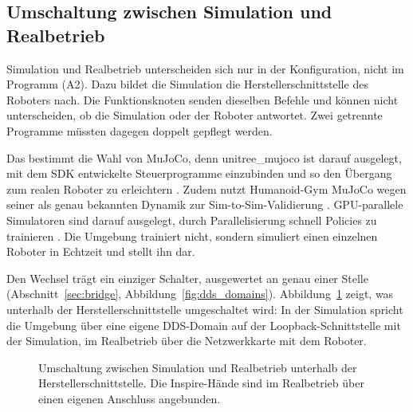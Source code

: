 \subsection{Umschaltung zwischen Simulation und Realbetrieb}
\label{sec:sim_real_schalter}
Simulation und Realbetrieb unterscheiden sich nur in der Konfiguration, nicht im Programm (A2).
Dazu bildet die Simulation die Herstellerschnittstelle des Roboters nach.
Die Funktionsknoten senden dieselben Befehle und können nicht unterscheiden, ob die Simulation oder der Roboter antwortet.
Zwei getrennte Programme müssten dagegen doppelt gepflegt werden.

Das bestimmt die Wahl von MuJoCo, denn unitree\_mujoco ist darauf ausgelegt, mit dem SDK entwickelte Steuerprogramme einzubinden und so den Übergang zum realen Roboter zu erleichtern \cite{UnitreeMujoco}.
Zudem nutzt Humanoid-Gym MuJoCo wegen seiner als genau bekannten Dynamik zur Sim-to-Sim-Validierung \cite{Gu2024}.
GPU-parallele Simulatoren sind darauf ausgelegt, durch Parallelisierung schnell Policies zu trainieren \cite{Rudin2021} \cite{Mittal2023}.
Die Umgebung trainiert nicht, sondern simuliert einen einzelnen Roboter in Echtzeit und stellt ihn dar.

Den Wechsel trägt ein einziger Schalter, ausgewertet an genau einer Stelle (Abschnitt~\ref{sec:bridge}, Abbildung~\ref{fig:dds_domains}).
Abbildung~\ref{fig:sim_real_schalter} zeigt, was unterhalb der Herstellerschnittstelle umgeschaltet wird: In der Simulation spricht die Umgebung über eine eigene DDS-Domain auf der Loopback-Schnittstelle mit der Simulation, im Realbetrieb über die Netzwerkkarte mit dem Roboter.

\begin{figure}[htbp]
  \centering
  
  \caption[Umschaltung zwischen Simulation und Realbetrieb]{Umschaltung zwischen Simulation und Realbetrieb unterhalb der Herstellerschnittstelle. Die Inspire-Hände sind im Realbetrieb über einen eigenen Anschluss angebunden.}
  \label{fig:sim_real_schalter}
\end{figure}

